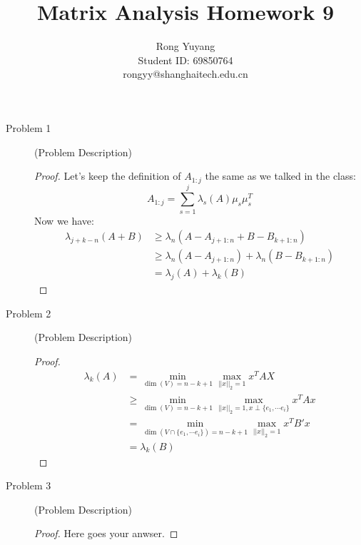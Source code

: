 \documentclass{article}
\title{Matrix Analysis Homework 9}
\author{Rong Yuyang \\ Student ID: 69850764 \\ rongyy@shanghaitech.edu.cn}
\begin{document}
\maketitle

\begin{description}
	\item[Problem 1] (Problem Description)
	\begin{proof}
		Let's keep the definition of $A_{1:j}$ the same as we talked in the class:
		$$ A_{1:j} = \sum_{s = 1}^{j}\lambda_s(A)\mu_s\mu_s^T$$
		Now we have:
		\begin{equation}\begin{aligned}
			\lambda_{j+k-n}(A+B)
			& \geq \lambda_{n}(A-A_{j+1:n} + B-B_{k+1:n}) \\
			& \geq \lambda_{n}(A-A_{j+1:n}) + \lambda_{n}(B-B_{k+1:n}) \\
			&   =  \lambda_{j}(A) + \lambda_{k}(B)
		\end{aligned}\end{equation}
	\end{proof}

	\item[Problem 2] (Problem Description)
	\begin{proof}
		\begin{equation}\begin{aligned}
			\lambda_k(A)
			& = \min_{\dim(V) = n-k+1} \max_{||x||_2 =1} x^TAX  \\
			& \geq \min_{\dim(V) = n-k+1} \max_{||x||_2 = 1, x \perp \{e_{1}, \cdots e_{i}\}} x^TAx \\
			& = \min_{\dim(V\cap\{e_{1}, \cdots e_{i}\}) = n-k+1} \max_{||x||_2 = 1} x^TB'x \\
			& = \lambda_k(B)


		\end{aligned}\end{equation}
	\end{proof}

	\item[Problem 3] (Problem Description)
	\begin{proof}

		Here goes your anwser.

	\end{proof}
\end{description}
\end{document}

